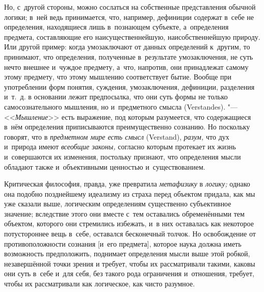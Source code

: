 Но, с~другой стороны, можно сослаться на собственные представления обычной
логики; в~ней ведь принимается, что, например, дефиниции содержат в~себе не
определения, находящиеся лишь в~познающем субъекте, а~определения предмета,
составляющие его наисущественнейшую, наисобственнейшую природу. Или другой
пример: когда умозаключают от данных определений к~другим, то принимают,
что определения, полученные в~результате умозаключения, не суть нечто
внешнее и~чуждое предмету, а~что, напротив, они принадлежат самому этому
предмету, что этому мышлению соответствует бытие. Вообще при употреблении
форм понятия, суждения, умозаключения, дефиниции, разделения и~т.~д. в
основании лежит предпосылка, что они суть формы не только самосознательного
мышления, но и~предметного смысла (Verstandes). "---
<<{\em Мышление}>> есть выражение, под которым
разумеется, что содержащиеся в~нём определения приписываются
преимущественно сознанию. Но поскольку говорят, что в
{\em предметном мире есть смысл} (Verstand),
{\em разум,} что дух и~природа имеют
{\em всеобщие законы,} согласно которым протекает их
жизнь и~совершаются их изменения, постольку признают, что определения мысли
обладают также и~объективными ценностью и~существованием.

Критическая философия, правда, уже превратила
{\em метафизику} в {\em логику;}
однако она подобно позднейшему
идеализму
из страха перед объектом придала, как мы уже сказали выше, логическим
определениям существенно субъективное значение; вследствие этого они вместе
с~тем оставались обременёнными тем объектом, которого они стремились
избежать, и~в них оставалась как некоторое потустороннее вещь в~себе,
оставался бесконечный толчок. Но освобождение от противоположности сознания
[и~его предмета], которое наука должна иметь возможность предположить,
поднимает определения мысли выше этой робкой, незавершённой точки зрения и
требует, чтобы их рассматривали такими, каковы они суть в~себе и~для себя,
без такого рода ограничения и~отношения, требует, чтобы их рассматривали
как логическое, как чисто разумное.

